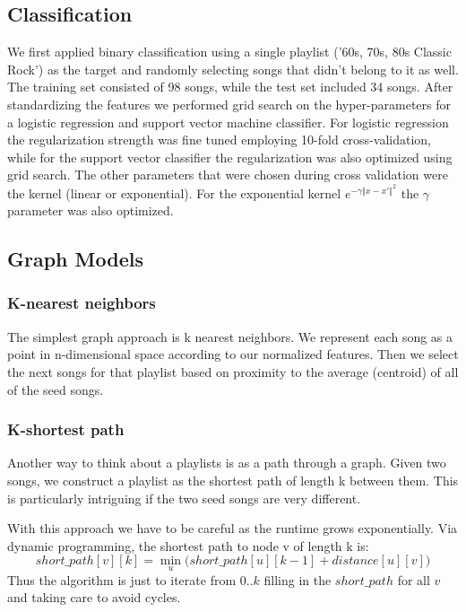 \documentclass[acmtog]{acmart}
\begin{document}
\subsection{Classification}

We first applied binary classification using a single playlist ('60s, 70s, 80s Classic Rock') as the target and randomly selecting songs that didn't belong to it as well. The training set consisted of 98 songs, while the test set included 34 songs. After standardizing the features we performed grid search on the hyper-parameters for a logistic regression and support vector machine classifier. For logistic regression the regularization strength was fine tuned employing 10-fold cross-validation, while for the support vector classifier the regularization was also optimized using grid search. The other parameters that were chosen during cross validation were the kernel (linear or exponential). For the exponential kernel $e^{-\gamma {\Vert x -x' \Vert}^{2}}$ the $\gamma$ parameter was also optimized. \cite{PythonMachineLearning}

\subsection{Graph Models}

\subsubsection{K-nearest neighbors}
The simplest graph approach is k nearest neighbors. We represent each song as a point in n-dimensional space according to our normalized features. Then we select the next songs for that playlist based on proximity to the average (centroid) of all of the seed songs.

\subsubsection{K-shortest path}

Another way to think about a playlists is as a path through a graph. Given two songs, we construct a playlist as the shortest path of length k between them. This is particularly intriguing if the two seed songs are very different.

With this approach we have to be careful as the runtime grows exponentially. Via dynamic programming, the shortest path to node v of length k is:
\[
  short\_path[v][k] = \min_u \Big ( short\_path[u][k-1] + distance[u][v] \Big)
\]
Thus the algorithm is just to iterate from $0..k$ filling in the $short\_path$ for all $v$ and taking care to avoid cycles.
\end{document}
